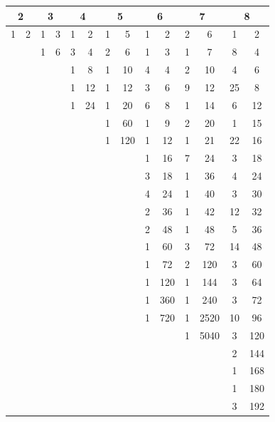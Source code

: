 \documentclass[11pt]{article}
\begin{document}
\begin{center}
\renewcommand{\arraystretch}{1.0}
\setlength{\tabcolsep}{6pt}
\small
\begin{tabular}{|cc|cc|cc|cc|cc|cc|cc|}
\hline
\multicolumn{2}{|c|}{2} & \multicolumn{2}{c|}{3} & \multicolumn{2}{c|}{4} & \multicolumn{2}{c|}{5} & \multicolumn{2}{c|}{6} & \multicolumn{2}{c|}{7} & \multicolumn{2}{c|}{8}\\
\hline
1 & 2 & 1 & 3 & 1 & 2 & 1 & 5  & 1 & 2   & 2 & 6    & 1 & 2\\
  &   & 1 & 6 & 3 & 4 & 2 & 6  & 1 & 3   & 1 & 7    & 8 & 4\\
  &   &   &   & 1 & 8 & 1 & 10 & 4 & 4   & 2 & 10   & 4 & 6\\
  &   &   &   & 1 & 12& 1 & 12 & 3 & 6   & 9 & 12   & 25& 8\\
  &   &   &   & 1 & 24& 1 & 20 & 6 & 8   & 1 & 14   & 6 & 12\\
  &   &   &   &   &   & 1 & 60 & 1 & 9   & 2 & 20   & 1 & 15\\
  &   &   &   &   &   & 1 & 120& 1 & 12  & 1 & 21   & 22& 16\\
  &   &   &   &   &   &   &    & 1 & 16  & 7 & 24   & 3 & 18\\
  &   &   &   &   &   &   &    & 3 & 18  & 1 & 36   & 4 & 24\\
  &   &   &   &   &   &   &    & 4 & 24  & 1 & 40   & 3 & 30\\
  &   &   &   &   &   &   &    & 2 & 36  & 1 & 42   & 12& 32\\
  &   &   &   &   &   &   &    & 2 & 48  & 1 & 48   & 5 & 36\\
  &   &   &   &   &   &   &    & 1 & 60  & 3 & 72   & 14& 48\\
  &   &   &   &   &   &   &    & 1 & 72  & 2 & 120  & 3 & 60\\
  &   &   &   &   &   &   &    & 1 & 120 & 1 & 144  & 3 & 64\\
  &   &   &   &   &   &   &    & 1 & 360 & 1 & 240  & 3 & 72\\
  &   &   &   &   &   &   &    & 1 & 720 & 1 & 2520 & 10& 96\\
  &   &   &   &   &   &   &    &   &     & 1 & 5040 & 3 & 120\\
  &   &   &   &   &   &   &    &   &     &   &      & 2 & 144\\
  &   &   &   &   &   &   &    &   &     &   &      & 1 & 168\\
  &   &   &   &   &   &   &    &   &     &   &      & 1 & 180\\
  &   &   &   &   &   &   &    &   &     &   &      & 3 & 192\\

\end{tabular}
\end{center}
\end{document}
